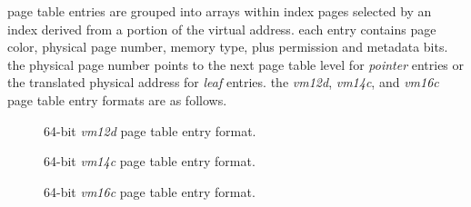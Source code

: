 page table entries are grouped into arrays within index pages selected by
an index derived from a portion of the virtual address.
each entry contains page color, physical page number, memory type, plus
permission and metadata bits. the physical page number points to the next
page table level for \emph{pointer} entries or the translated physical
address for \emph{leaf} entries.
\para
the \emph{vm12d}, \emph{vm14c}, and \emph{vm16c} page table entry formats
are as follows.
\\
\begin{figure}[H]
\centering
{}
\caption{64-bit \emph{vm12d} page table entry format.}
\label{fig:64-bit-vm12d-pte-format}
\end{figure}

\begin{figure}[H]
\centering
{}
\caption{64-bit \emph{vm14c} page table entry format.}
\label{fig:64-bit-vm14c-pte-format}
\end{figure}

\begin{figure}[H]
\centering
{}
\caption{64-bit \emph{vm16c} page table entry format.}
\label{fig:64-bit-vm16c-pte-format}
\end{figure}

